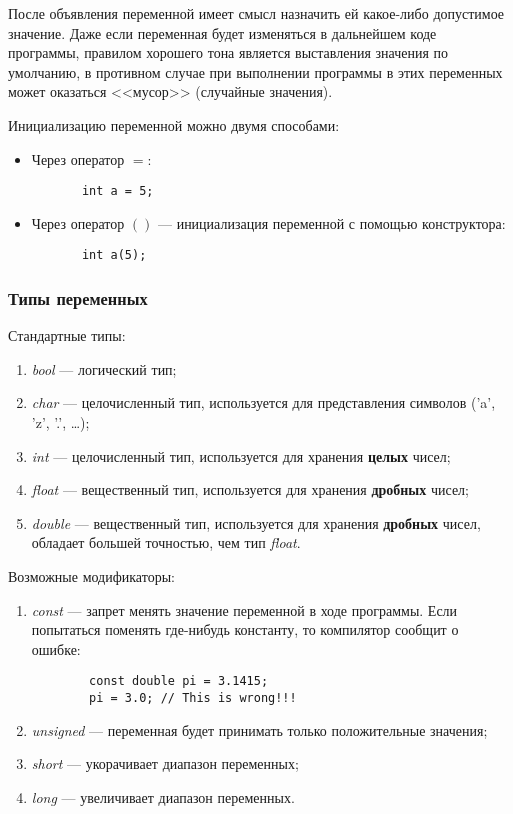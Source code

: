После объявления переменной имеет смысл назначить ей какое-либо допустимое значение. Даже если переменная будет изменяться в дальнейшем коде программы, правилом хорошего тона является выставления значения по умолчанию, в противном случае при выполнении программы в этих переменных может оказаться <<мусор>> (случайные значения).

Инициализацию переменной можно двумя способами:
\begin{itemize}
    \item Через оператор $=$:
    \begin{lstlisting}
       int a = 5;
    \end{lstlisting}
    \item Через оператор $()$ --- инициализация переменной с помощью конструктора:
    \lstset{style=CPlusPlus}
    \begin{lstlisting}
       int a(5);
    \end{lstlisting}
\end{itemize}

\subsubsection{Типы переменных}
Стандартные типы:
\begin{enumerate}
    \item \textit{bool} --- логический тип;
    \item \textit{char} --- целочисленный тип, используется для представления символов ('a', 'z', '.', \ldots);
    \item \textit{int} --- целочисленный тип, используется для хранения \textbf{целых} чисел;
    \item \textit{float} --- вещественный тип, используется для хранения \textbf{дробных} чисел;
    \item \textit{double} --- вещественный тип, используется для хранения \textbf{дробных} чисел, обладает большей точностью, чем тип \textit{float}.
\end{enumerate}

Возможные модификаторы:
\begin{enumerate}
    \item \textit{const} --- запрет менять значение переменной в ходе программы. Если попытаться поменять где-нибудь константу, то компилятор сообщит о ошибке:
    \begin{lstlisting}
        const double pi = 3.1415;
        pi = 3.0; // This is wrong!!!
    \end{lstlisting}
    \item \textit{unsigned} --- переменная будет принимать только положительные значения;
    \item \textit{short} --- укорачивает диапазон переменных;
    \item \textit{long} --- увеличивает диапазон переменных.
\end{enumerate}

